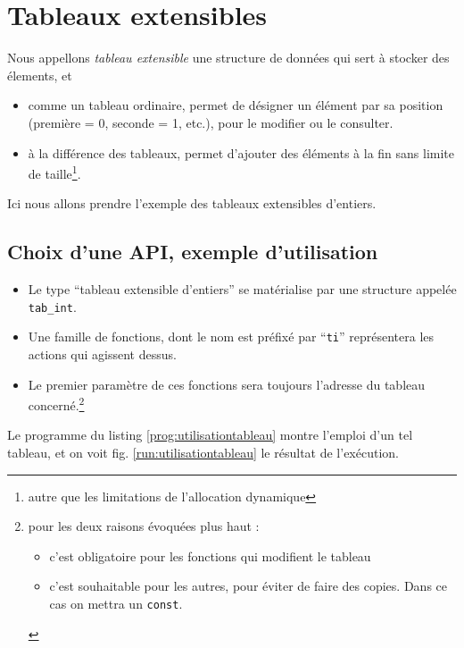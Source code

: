 \chapter{Tableaux extensibles}

Nous appellons \emph{tableau extensible} une structure de
données qui sert à stocker des élements, et

\begin{itemize}
\item comme un tableau ordinaire, permet de désigner un
  élément par sa position (première =  0, seconde = 1, etc.),
  pour le modifier ou le consulter.
\item à la différence des tableaux, permet d'ajouter des éléments
  à la fin sans limite de taille\footnote{autre que les limitations
    de l'allocation dynamique}.
\end{itemize}

Ici nous allons prendre l'exemple des tableaux extensibles d'entiers.

\section{Choix d'une API, exemple d'utilisation}

\begin{itemize}
 \item
Le type ``tableau extensible d'entiers'' se matérialise par une
structure appelée \texttt{tab\_int}.
\item
Une famille de fonctions, dont le nom est préfixé par ``\texttt{ti}''
représentera les actions qui agissent dessus.
\item
  Le premier paramètre de ces fonctions sera toujours l'adresse du
  tableau concerné.\footnote{pour les deux raisons évoquées plus haut
    :
    \begin{itemize}
    \item c'est obligatoire pour les  fonctions qui  modifient le tableau
    \item c'est souhaitable pour les autres, pour éviter de faire des copies. Dans ce cas on mettra un \texttt{const}.
    \end{itemize}
    }
\end{itemize}

Le programme du listing \ref{prog:utilisationtableau}
montre l'emploi d'un tel tableau, et on voit
fig. \ref{run:utilisationtableau} le résultat de l'exécution.
 


